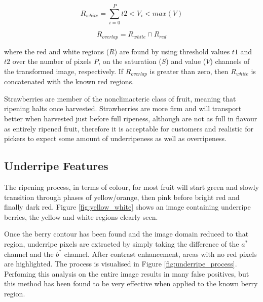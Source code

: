 \documentclass[fleqn,twoside,12pt]{report}
\begin{document}
\begin{equation}
R_{white} = \sum_{i=0}^{P}t2<V_i<max(V)
\label{white_berry_thresh}
\end{equation}

\begin{equation}
R_{overlap} = R_{white} \cap R_{red}
\label{intersect_white_berry}
\end{equation}

where the red and white regions ($R$) are found by using threshold values $t1$ and $t2$ over the number of pixels $P$, on the saturation ($S$) and value ($V$) channels of the transformed image, respectively. If $R_{overlap}$ is greater than zero, then $R_{white}$ is concatenated with the known red regions. 

Strawberries are member of the nonclimacteric class of fruit, meaning that ripening halts once harvested. Strawberries are more firm and will transport better when harvested just before full ripeness, although are not as full in flavour as entirely ripened fruit\cite{artur}, therefore it is acceptable for customers and realistic for pickers to expect some amount of underripeness as well as overripeness. 


\subsection{Underripe Features}

The ripening process, in terms of colour, for most fruit will start green and slowly transition through phases of yellow/orange, then pink before bright red and finally dark red. Figure \ref{fig:yellow_white} shows an image containing underripe berries, the yellow and white regions clearly seen.

Once the berry contour has been found and the image domain reduced to that region, underripe pixels are extracted by simply taking the difference of the $a^*$ channel and the $b^*$ channel. After contrast enhancement, areas with no red pixels are highlighted. The process is visualised in Figure \ref{fig:underripe_process}. Perfoming this analysis on the entire image results in many false positives, but this method has been found to be very effective when applied to the known berry region.   
\end{document}
